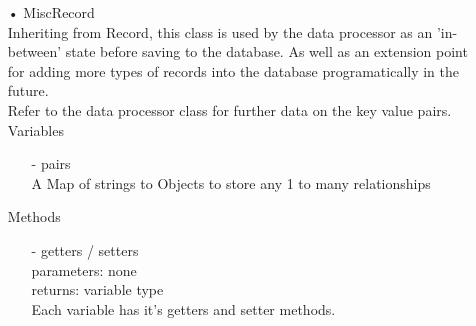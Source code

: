 \documentclass[oneside, english, final]{design}
\begin{document}
\begin{itemize}
	\item[•]MiscRecord
	      \\Inheriting from Record, this class is used by the data processor as an 'in-between' state before saving to the database. As well as an extension point for adding more types of records into the database programatically in the future.
	      \\Refer to the data processor class for further data on the key value pairs.
	      \\Variables
	      \begin{itemize}
		      \item[-] pairs
		            \\ A Map of strings to Objects to store any 1 to many relationships
	      \end{itemize}
	      Methods
	      \begin{itemize}
		      \item[-]getters / setters
		            \\parameters: none
		            \\returns: variable type
		            \\Each variable has it's getters and setter methods.
	      \end{itemize}


\end{itemize}
\end{document}
